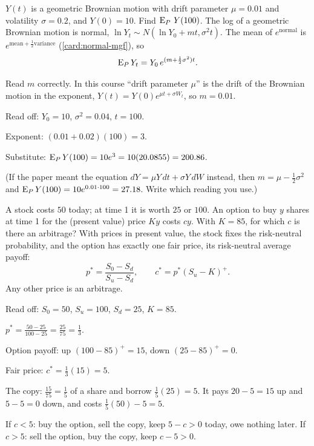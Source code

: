 \begin{problem}[Q1(b)]
$Y(t)$ is a geometric Brownian motion with drift parameter $\mu=0.01$ and volatility $\sigma=0.2$, and $Y(0)=10$. Find $\operatorname{E}_P\,Y(100)$.
\cardsays The log of a geometric Brownian motion is normal, $\ln Y_t\sim N(\ln Y_0+mt,\sigma^2t)$. The mean of $e^{\text{normal}}$ is $e^{\text{mean}+\frac12\text{variance}}$ (\cref{card:normal-mgf}), so
\[
\operatorname{E}_PY_t=Y_0\,e^{(m+\frac12\sigma^2)t}.
\]
\working
\begin{steps}
\item Read $m$ correctly. In this course ``drift parameter $\mu$'' is the drift of the Brownian motion in the exponent, $Y(t)=Y(0)e^{\mu t+\sigma W_t}$, so $m=0.01$.
\item Read off: $Y_0=10$, $\sigma^2=0.04$, $t=100$.
\item Exponent: $(0.01+0.02)(100)=3$.
\item Substitute: $\operatorname{E}_PY(100)=10e^3=10(20.0855)=200.86$.
\item (If the paper meant the equation $dY=\mu Y\,dt+\sigma Y\,dW$ instead, then $m=\mu-\frac12\sigma^2$ and $\operatorname{E}_PY(100)=10e^{0.01\cdot100}=27.18$. Write which reading you use.)
\end{steps}
\end{problem}

\begin{problem}[Q1(c)]
A stock costs $50$ today; at time 1 it is worth $25$ or $100$. An option to buy $y$ shares at time 1 for the (present value) price $Ky$ costs $cy$. With $K=85$, for which $c$ is there an arbitrage?
\cardsays With prices in present value, the stock fixes the risk-neutral probability, and the option has exactly one fair price, its risk-neutral average payoff:
\[
p^*=\frac{S_0-S_d}{S_u-S_d},\qquad c^*=p^*(S_u-K)^+.
\]
Any other price is an arbitrage.
\working
\begin{steps}
\item Read off: $S_0=50$, $S_u=100$, $S_d=25$, $K=85$.
\item $p^*=\frac{50-25}{100-25}=\frac{25}{75}=\frac13$.
\item Option payoff: up $(100-85)^+=15$, down $(25-85)^+=0$.
\item Fair price: $c^*=\frac13(15)=5$.
\item The copy: $\frac{15}{75}=\frac15$ of a share and borrow $\frac15(25)=5$. It pays $20-5=15$ up and $5-5=0$ down, and costs $\frac15(50)-5=5$.
\item If $c<5$: buy the option, sell the copy, keep $5-c>0$ today, owe nothing later. If $c>5$: sell the option, buy the copy, keep $c-5>0$.
\end{steps}
\end{problem}

